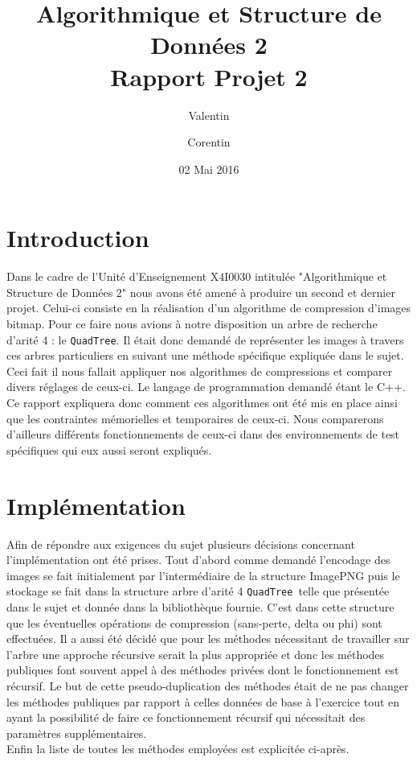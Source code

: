 \documentclass{article}
\title{Algorithmique et Structure de Données 2\\
	Rapport Projet 2}
\author{Valentin \bsc{Hénique} \and Corentin \bsc{Chédotal}}
\date{02 Mai 2016}
\newcommand{\info}{\texttt}
\newcommand{\qt}{\info{QuadTree}}
\begin{document}
	
	\maketitle
	
	\section{Introduction}
	
	Dans le cadre de l'Unité d'Enseignement X4I0030 intitulée "Algorithmique et Structure de Données 2" nous avons été amené à produire un second et dernier projet. Celui-ci consiste en la réalisation d'un algorithme de compression d'images bitmap. Pour ce faire nous avions à notre disposition un arbre de recherche d'arité 4 : le \qt. Il était donc demandé de représenter les images à travers ces arbres particuliers en suivant une méthode spécifique expliquée dans le sujet. Ceci fait il nous fallait appliquer nos algorithmes de compressions et comparer divers réglages de ceux-ci.
	Le langage de programmation demandé étant le C++.\\
	Ce rapport expliquera donc comment ces algorithmes ont été mis en place ainsi que les contraintes mémorielles et temporaires de ceux-ci. Nous comparerons d'ailleurs différents fonctionnements de ceux-ci dans des environnements de test spécifiques qui eux aussi seront expliqués.
	
	\section{Implémentation}
	
	Afin de répondre aux exigences du sujet plusieurs décisions concernant l'implémentation ont été prises. Tout d'abord comme demandé l'encodage des images se fait initialement par l'intermédiaire de la structure ImagePNG puis le stockage se fait dans la structure arbre d'arité 4 \qt\ telle que présentée dans le sujet et donnée dans la bibliothèque fournie. C'est dans cette structure que les éventuelles opérations de compression (sans-perte, delta ou phi) sont effectuées. Il a aussi été décidé que pour les méthodes nécessitant de travailler sur l'arbre une approche récursive serait la plus appropriée et donc les méthodes publiques font souvent appel à des méthodes privées dont le fonctionnement est récursif. Le but de cette pseudo-duplication des méthodes était de ne pas changer les méthodes publiques par rapport à celles données de base à l'exercice tout en ayant la possibilité de faire ce fonctionnement récursif qui nécessitait des paramètres supplémentaires.\\
	Enfin la liste de toutes les méthodes employées est explicitée ci-après.
	
\end{document}
